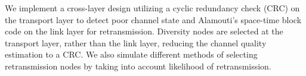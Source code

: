 We implement a cross-layer design utilizing a cyclic redundancy check (CRC) on the transport layer to detect poor channel state and Alamouti's space-time block code on the link layer for retransmission.  Diversity nodes are selected at the transport layer, rather than the link layer, reducing the channel quality estimation to a CRC.  We also simulate different methods of selecting retransmission nodes by taking into account likelihood of retransmission.